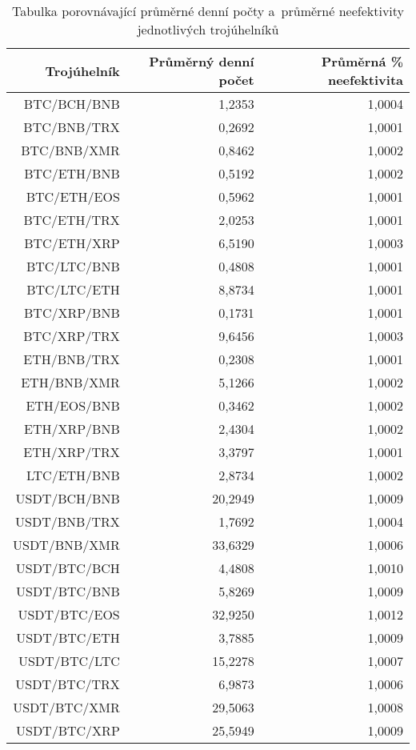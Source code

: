 \begin{table}\centering
\caption{Tabulka porovnávající průměrné denní počty a~průměrné neefektivity jednotlivých trojúhelníků}
\label{table_averages}
\begin{tabular}{|| r | r | r ||}\hline Trojúhelník & Průměrný denní počet & Průměrná \% neefektivita\\ [0.5ex]
 \hline\hline BTC/BCH/BNB & 1,2353 & 1,0004\\ 
 \hline BTC/BNB/TRX & 0,2692 & 1,0001\\ 
 \hline BTC/BNB/XMR & 0,8462 & 1,0002\\ 
 \hline BTC/ETH/BNB & 0,5192 & 1,0002\\ 
 \hline BTC/ETH/EOS & 0,5962 & 1,0001\\ 
 \hline BTC/ETH/TRX & 2,0253 & 1,0001\\ 
 \hline BTC/ETH/XRP & 6,5190 & 1,0003\\ 
 \hline BTC/LTC/BNB & 0,4808 & 1,0001\\ 
 \hline BTC/LTC/ETH & 8,8734 & 1,0001\\ 
 \hline BTC/XRP/BNB & 0,1731 & 1,0001\\ 
 \hline BTC/XRP/TRX & 9,6456 & 1,0003\\ 
 \hline ETH/BNB/TRX & 0,2308 & 1,0001\\ 
 \hline ETH/BNB/XMR & 5,1266 & 1,0002\\ 
 \hline ETH/EOS/BNB & 0,3462 & 1,0002\\ 
 \hline ETH/XRP/BNB & 2,4304 & 1,0002\\ 
 \hline ETH/XRP/TRX & 3,3797 & 1,0001\\ 
 \hline LTC/ETH/BNB & 2,8734 & 1,0002\\ 
 \hline USDT/BCH/BNB & 20,2949 & 1,0009\\ 
 \hline USDT/BNB/TRX & 1,7692 & 1,0004\\ 
 \hline USDT/BNB/XMR & 33,6329 & 1,0006\\ 
 \hline USDT/BTC/BCH & 4,4808 & 1,0010\\ 
 \hline USDT/BTC/BNB & 5,8269 & 1,0009\\ 
 \hline USDT/BTC/EOS & 32,9250 & 1,0012\\ 
 \hline USDT/BTC/ETH & 3,7885 & 1,0009\\ 
 \hline USDT/BTC/LTC & 15,2278 & 1,0007\\ 
 \hline USDT/BTC/TRX & 6,9873 & 1,0006\\ 
 \hline USDT/BTC/XMR & 29,5063 & 1,0008\\ 
 \hline USDT/BTC/XRP & 25,5949 & 1,0009\\ 

\end{tabular}
\end{table}
